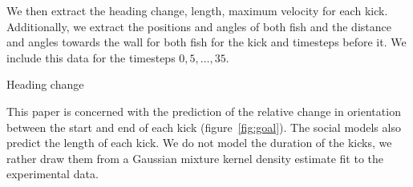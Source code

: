 \documentclass[nobib]{tufte-handout}
\begin{document}
We then extract the heading change, length, maximum velocity for each kick.
Additionally, we extract the positions and angles of both fish and the distance and angles towards the wall for both fish for the kick and timesteps before it.
We include this data for the timesteps \(0, 5, \ldots, 35 \).

\begin{marginfigure}
    \centering
{} 
\caption{Heading change}
\label{fig:goal}
\end{marginfigure}

This paper is concerned with the prediction of the relative change in orientation between the start and end of each kick (figure~\ref{fig:goal}).
The social models also predict the length of each kick.
We do not model the duration of the kicks, we rather draw them from a Gaussian mixture kernel density estimate fit to the experimental data.
\end{document}
